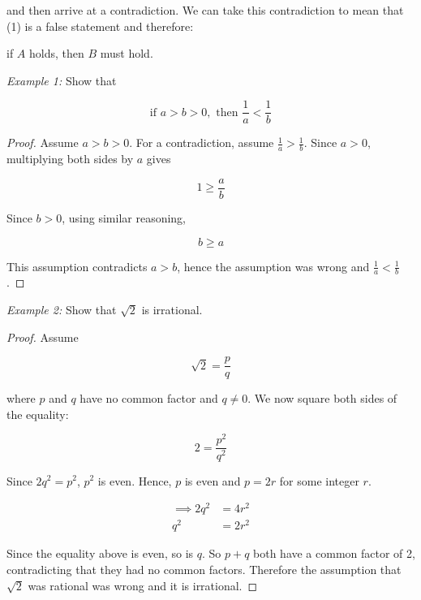     \noindent and then arrive at a contradiction. We can take this contradiction to mean that (1) is a false statement and therefore:

    \begin{center}
        if $A$ holds, then $B$ must hold.
    \end{center}

    \noindent \color{blue} \textit{Example 1: } Show that

    \[
        \text{if } a > b > 0, \text{ then } \frac{1}{a} < \frac{1}{b}
    \]

    \color{black}

    \begin{proof}
        \noindent Assume $a>b>0$. For a contradiction, assume $\frac{1}{a} > \frac{1}{b}$. Since $a>0$, multiplying both sides by $a$ gives

        \[
            1 \geq \frac{a}{b}
        \]

        \noindent Since $b>0$, using similar reasoning,

        \[
            b \geq a
        \]

        \noindent This assumption contradicts $a > b$, hence the assumption was wrong and $\frac{1}{a} < \frac{1}{b}$.
    \end{proof}

    \noindent \color{blue} \textit{Example 2:} Show that $\sqrt{2}$ is irrational. \color{black} \\

    \begin{proof}
        \noindent Assume

        \[
            \sqrt{2} = \frac{p}{q}
        \]

        \noindent where $p$ and $q$ have no common factor and $q\not = 0$. We now square both sides of the equality:

        \[
            2 = \frac{p^2}{q^2}
        \]

        \noindent Since $2q^2 = p^2$, $p^2$ is even. Hence, $p$ is even and $p=2r$ for some integer $r$.

        \begin{align*}
            \implies 2q^2 &= 4r^2 \\
            q^2  &= 2r^2
        \end{align*}

        \noindent Since the equality above is even, so is $q$. So $p+q$ both have a common factor of 2, contradicting that they had no common factors. Therefore the assumption that $\sqrt{2}$ was rational was wrong and it is
        irrational.
    \end{proof}


